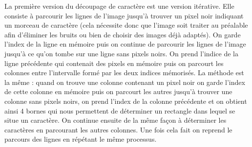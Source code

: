 \documentclass[12pt]{report}
\begin{document}
La première version du découpage de caractère est une version itérative. Elle consiste à parcourir les lignes de l'image jusqu'à trouver un pixel noir indiquant un morceau de caractère (cela nécessite donc que l'image soit traiter au préalable afin d'éliminer les bruits ou bien de choisir des images déjà adaptés). On  garde l'index de la ligne en mémoire puis on continue de parcourir les lignes de l'image jusqu'à ce qu'on tombe sur une ligne sans pixels noirs. On prend l'indice de la ligne précédente qui contenait des pixels en mémoire puis on parcourt les colonnes entre l'intervalle formé par les deux indices mémorisés. La méthode est la même : quand on trouve une colonne contenant un pixel noir on garde l'index de cette colonne en mémoire puis on parcourt les autres jusqu'à trouver une colonne sans pixels noirs, on prend l'index de la colonne précédente et on obtient ainsi 4 bornes qui nous permettent de déterminer un rectangle dans lequel se situe un caractère. On continue ensuite de la même façon à déterminer les caractères en parcourant les autres colonnes. Une fois cela fait on reprend le parcours des lignes en répétant le même processus.
\end{document}
